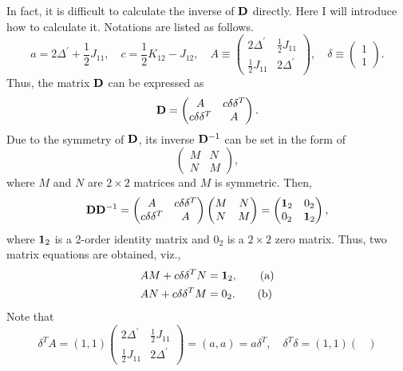 \documentclass[a4paper]{book}
\newcounter{solution}[chapter]
\newcommand{\D}{{\bf D}}
\newcommand{\I}{{\bf 1}}
\begin{document}
\begin{solution}
\begin{itemize}
	In fact, it is difficult to calculate the inverse of $\D$ directly. Here I will introduce how to calculate it. Notations are listed as follows.
	\[
		a = 2\Delta^\prime + \frac{1}{2} J_{11}, \quad c= \frac{1}{2} K_{12} - J_{12} , \quad  A \equiv \begin{pmatrix}
			2 \Delta^\prime & \frac{1}{2} J_{11} \\ \frac{1}{2} J_{11} & 2 \Delta^\prime
		\end{pmatrix}, \quad \delta \equiv \begin{pmatrix}
			1 \\ 1
		\end{pmatrix}.
	\]
	Thus, the matrix $\D$ can be expressed as
	\[
		\D = \begin{pmatrix}
			A & c \delta \delta^T \\
			c \delta \delta^T & A 
		\end{pmatrix}.
	\]
	Due to the symmetry of $\D$, its inverse $\D^{-1}$ can be set in the form of
	\[
		\begin{pmatrix}
			M & N \\
			N & M
		\end{pmatrix},
	\]
	where $M$ and $N$ are $2\times2$ matrices and $M$ is symmetric. Then,
	\[
		\D \D^{-1} = \begin{pmatrix}
			A & c \delta \delta^T \\
			c \delta \delta^T & A 
		\end{pmatrix} \begin{pmatrix}
			M & N \\
			N & M
		\end{pmatrix} = \begin{pmatrix}
			\I_2 & 0_2 \\
			0_2 & \I_2
		\end{pmatrix},
	\]
	where $\I_2$ is a 2-order identity matrix and $0_2$ is a $2 \times 2$ zero matrix. Thus, two matrix equations are obtained, viz.,
	\begin{align*}
		AM + c \delta \delta^T N &= \I_2 , \tag{a} \\
		AN + c \delta \delta^T M &= 0_2 . \tag{b}
	\end{align*}
	Note that
	\[
		\delta^T A = (1,1) \begin{pmatrix}
			2 \Delta^\prime & \frac{1}{2} J_{11} \\ \frac{1}{2} J_{11} & 2 \Delta^\prime
		\end{pmatrix} = ( a , a ) = a \delta^T, \quad \delta^T \delta = (1,1) \begin{pmatrix}

\end{pmatrix}\]
\end{itemize}
\end{solution}
\end{document}

